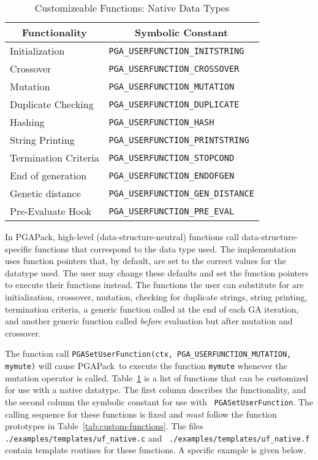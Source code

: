 \documentclass{report}
\newcommand{\pga}{PGAPack}
\begin{document}
\begin{table}
\centering
\caption
{Customizeable Functions: Native Data Types\label{tab:custom-functions1} }
\begin{tabular}{|l|l|} \hline\hline
\multicolumn{1}{|c|}{Functionality} &
\multicolumn{1}{c|}{Symbolic Constant} \\ \hline
Initialization       & \verb+PGA_USERFUNCTION_INITSTRING+ \\
Crossover            & \verb+PGA_USERFUNCTION_CROSSOVER+ \\
Mutation             & \verb+PGA_USERFUNCTION_MUTATION+ \\
Duplicate Checking   & \verb+PGA_USERFUNCTION_DUPLICATE+ \\
Hashing              & \verb+PGA_USERFUNCTION_HASH+ \\
String Printing      & \verb+PGA_USERFUNCTION_PRINTSTRING+ \\
Termination Criteria & \verb+PGA_USERFUNCTION_STOPCOND+ \\
End of generation    & \verb+PGA_USERFUNCTION_ENDOFGEN+ \\
Genetic distance     & \verb+PGA_USERFUNCTION_GEN_DISTANCE+ \\
Pre-Evaluate Hook    & \verb+PGA_USERFUNCTION_PRE_EVAL+ \\
\hline
\end{tabular}
\end{table}

In \pga, high-level (data-structure-neutral) functions call
data-structure-specific functions that correspond to the data type used.  The
implementation uses function pointers that, by default, are set to the correct
values for the datatype used.  The user may change these defaults and set the
function pointers to execute their functions instead.  The functions the user
can substitute for are initialization, crossover, mutation, checking for
duplicate strings, string printing, termination criteria, a generic
function called at the end of each GA iteration, and another generic
function called \textit{before} evaluation but after mutation and
crossover.

The function call {\tt PGASetUserFunction(ctx, PGA\_USERFUNCTION\_MUTATION,
mymute)} will cause
\pga\ to execute the function {\tt mymute} whenever the mutation operator is
called.  Table~\ref{tab:custom-functions1} is a list of functions that can be
customized for use with a native datatype.  The first column describes the
functionality, and the second column the symbolic constant for use with {\tt
PGASetUserFunction}.  The calling sequence for these functions is fixed and
{\em must} follow the function prototypes in Table~\ref{tab:custom-functions}.
The files {\tt ./examples/templates/uf\_native.c} and {\tt
./examples/templates/uf\_native.f} contain template routines for these
functions.  A specific example is given below.
\end{document}
